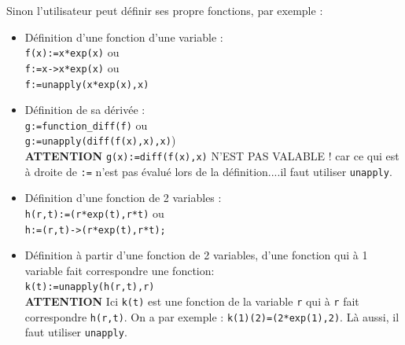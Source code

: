 \documentclass{article}
\begin{document}
Sinon l'utilisateur peut d\'efinir ses propre fonctions, par exemple :
\begin{itemize}
\item D\'efinition d'une fonction d'une variable :\\
{\tt f(x):=x*exp(x)} ou\\
{\tt f:=x->x*exp(x)} ou\\
{\tt f:=unapply(x*exp(x),x)}
\item D\'efinition de sa d\'eriv\'ee :\\
{\tt g:=function\_diff(f)} ou \\
{\tt g:=unapply(diff(f(x),x),x)})\\
{\bf ATTENTION} {\tt g(x):=diff(f(x),x)} N'EST PAS VALABLE ! car ce qui est 
\`a droite de {\tt :=} n'est pas \'evalu\'e lors de la d\'efinition....il
faut utiliser {\tt unapply}.
\item D\'efinition d'une fonction de 2 variables :\\
{\tt h(r,t):=(r*exp(t),r*t)} ou\\
{\tt h:=(r,t)->(r*exp(t),r*t);}
\item D\'efinition \`a partir d'une fonction de 2 variables, d'une fonction qui
\`a 1 variable fait correspondre une fonction:\\
{\tt k(t):=unapply(h(r,t),r)}\\
{\bf ATTENTION} Ici {\tt k(t)} est une fonction de la variable {\tt r}
qui \`a {\tt r} fait 
correspondre {\tt h(r,t)}. On a par exemple : {\tt k(1)(2)=(2*exp(1),2)}. L\`a aussi, il faut 
utiliser {\tt unapply}.
\end{itemize}
\end{document}
